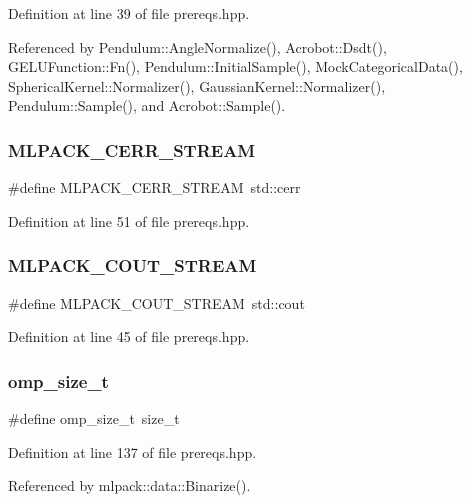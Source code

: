 Definition at line 39 of file prereqs.\+hpp.



Referenced by Pendulum\+::\+Angle\+Normalize(), Acrobot\+::\+Dsdt(), G\+E\+L\+U\+Function\+::\+Fn(), Pendulum\+::\+Initial\+Sample(), Mock\+Categorical\+Data(), Spherical\+Kernel\+::\+Normalizer(), Gaussian\+Kernel\+::\+Normalizer(), Pendulum\+::\+Sample(), and Acrobot\+::\+Sample().

\mbox{\label{prereqs_8hpp_a89a431954d35985cb0b2b39904d0b26e}} 
\subsubsection{M\+L\+P\+A\+C\+K\+\_\+\+C\+E\+R\+R\+\_\+\+S\+T\+R\+E\+AM}
{\footnotesize\ttfamily \#define M\+L\+P\+A\+C\+K\+\_\+\+C\+E\+R\+R\+\_\+\+S\+T\+R\+E\+AM~std\+::cerr}



Definition at line 51 of file prereqs.\+hpp.

\mbox{\label{prereqs_8hpp_a5971beeefae501e4761dd6e1cad457b1}} 
\subsubsection{M\+L\+P\+A\+C\+K\+\_\+\+C\+O\+U\+T\+\_\+\+S\+T\+R\+E\+AM}
{\footnotesize\ttfamily \#define M\+L\+P\+A\+C\+K\+\_\+\+C\+O\+U\+T\+\_\+\+S\+T\+R\+E\+AM~std\+::cout}



Definition at line 45 of file prereqs.\+hpp.

\mbox{\label{prereqs_8hpp_aabfb1575af92c0bf8bcaafdf1bfffb87}} 
\subsubsection{omp\+\_\+size\+\_\+t}
{\footnotesize\ttfamily \#define omp\+\_\+size\+\_\+t~size\+\_\+t}



Definition at line 137 of file prereqs.\+hpp.



Referenced by mlpack\+::data\+::\+Binarize().

